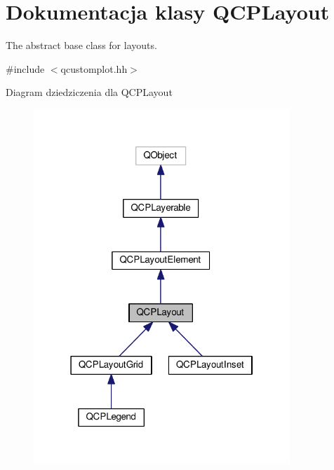 \hypertarget{class_q_c_p_layout}{}\section{Dokumentacja klasy Q\+C\+P\+Layout}
\label{class_q_c_p_layout}


The abstract base class for layouts.  




{\ttfamily \#include $<$qcustomplot.\+hh$>$}



Diagram dziedziczenia dla Q\+C\+P\+Layout\nopagebreak
\begin{figure}[H]
\begin{center}
\leavevmode
\includegraphics[width=274pt]{class_q_c_p_layout__inherit__graph}
\end{center}
\end{figure}


